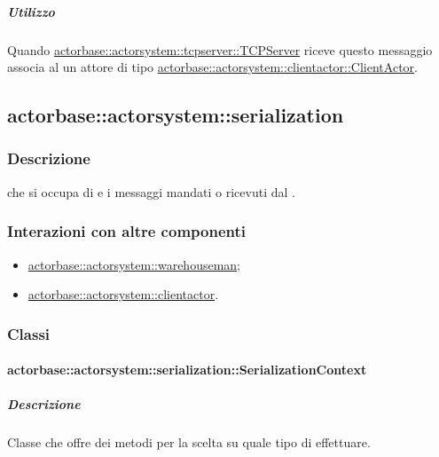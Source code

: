 \documentclass{scalatekids-article}
\begin{document}
\subparagraph{Utilizzo}

Quando \hyperref[sec:actorbase::actorsystem::tcpserver::TCPServer]{actorbase::actorsystem::tcpserver::TCPServer}
riceve questo messaggio associa al  un attore di tipo
\hyperref[sec:actorbase::actorsystem::clientactor::ClientActor]{actorbase::actorsystem::clientactor::ClientActor}.

\subsection{actorbase::actorsystem::serialization}
\label{sec:actorbase::actorsystem::serialization}

\subsubsection{Descrizione}

 che si occupa di  e 
i messaggi mandati o ricevuti dal .

\subsubsection{Interazioni con altre componenti}

\begin{itemize}

\item \hyperref[sec:actorbase::actorsystem::warehouseman]{actorbase::actorsystem::warehouseman};
\item \hyperref[sec:actorbase::actorsystem::clientactor]{actorbase::actorsystem::clientactor}.

\end{itemize}

\subsubsection{Classi}

\paragraph{actorbase::actorsystem::serialization::SerializationContext}
\label{sec:actorbase::actorsystem::serialization::SerializationContext}

\subparagraph{Descrizione}

Classe che offre dei metodi per la scelta su quale tipo di 
effettuare.
\end{document}
